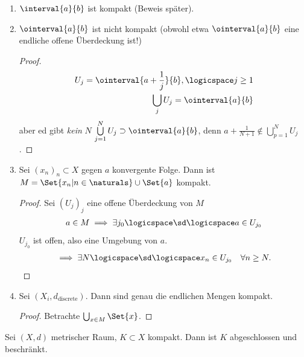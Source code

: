 \begin{beispiele}
    \begin{enumerate}
        \item \( \interval{a}{b} \) ist kompakt (Beweis später).
        \item \( \ointerval{a}{b} \) ist nicht kompakt (obwohl etwa \( \ointerval{a}{b} \) eine endliche offene Überdeckung ist!)
        \begin{proof}
            \begin{align*}
                U_j=\ointerval{a+\frac{1}{j}}{b},\logicspace j\geq 1\\
                \bigcup_j U_j=\ointerval{a}{b} 
            \end{align*}
            aber ed gibt \emph{kein} \( N\) \sd
                \( \bigcup\limits_{j=1}^{N}U_j\supset \ointerval{a}{b} \), denn \zb \( a+\frac{1}{N+1}\notin \bigcup_{p=1}^{N}U_j \).  
        \end{proof}
        
        \item Sei \( (x_n)_n\subset X\) gegen \( a\) konvergente Folge. Dann ist \( M=\Set{x_n|n\in \naturals }\cup \Set{a}\) kompakt.
        \begin{proof}
            Sei \( (U_j)_j\) eine offene Überdeckung von \( M\)
            \begin{align*}
                a\in M\implies \exists j_0\logicspace \sd \logicspace a\in U_{j_0}
            \end{align*} 
            \( U_{j_0}\) ist offen, also eine Umgebung von \( a\).
            \begin{align*}
                \implies \exists N\logicspace \sd \logicspace  x_n\in U_{j_0}\quad \forall n\geq N.
            \end{align*}
        \end{proof}
        
        \item Sei \( (X_i,d_{\text{discrete}})\). Dann sind genau die endlichen Mengen kompakt.
        \begin{proof}
            Betrachte \( \bigcup_{x\in M} \Set{x}\). 
        \end{proof}        
    \end{enumerate}
\end{beispiele}
\begin{satz}\label{kompakt:abgeschlossen_beschraenkt}
    Sei \( (X,d)\) metrischer Raum, \( K\subset X\) kompakt. Dann ist \( K\) abgeschlossen und beschränkt. 
\end{satz}
